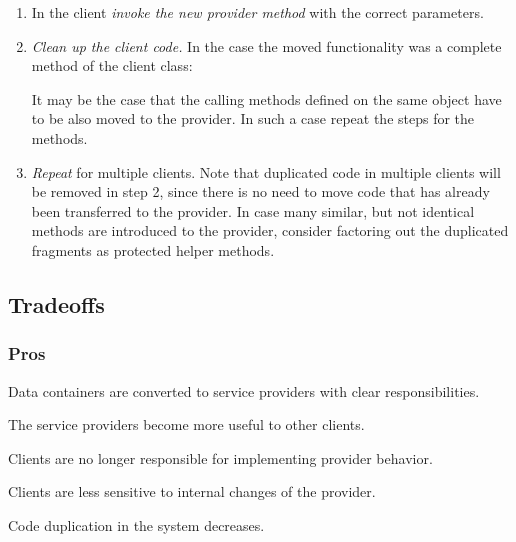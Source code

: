 \documentclass[a4paper,10pt,twoside]{book}
\begin{document}
\begin{enumerate}
\item In the client \emph{invoke the new provider method} with the correct parameters.

\item \emph{Clean up the client code.} In the case the moved functionality was a complete method of the client class:


It may be the case that the calling methods defined on the same object have to be also moved to the provider. In such a case repeat the steps for the methods.

\item \emph{Repeat} for multiple clients. Note that duplicated code in multiple clients will be removed in step 2, since there is no need to move code that has already been transferred to the provider. In case many similar, but not identical methods are introduced to the provider, consider factoring out the duplicated fragments as protected helper methods.

\end{enumerate}

\subsection*{Tradeoffs}

\subsubsection*{Pros}

\begin{bulletlist}
\item Data containers are converted to service providers with clear responsibilities.

\item The service providers become more useful to other clients.

\item Clients are no longer responsible for implementing provider behavior.

\item Clients are less sensitive to internal changes of the provider. 

\item Code duplication in the system decreases.
\end{bulletlist}
\end{document}
